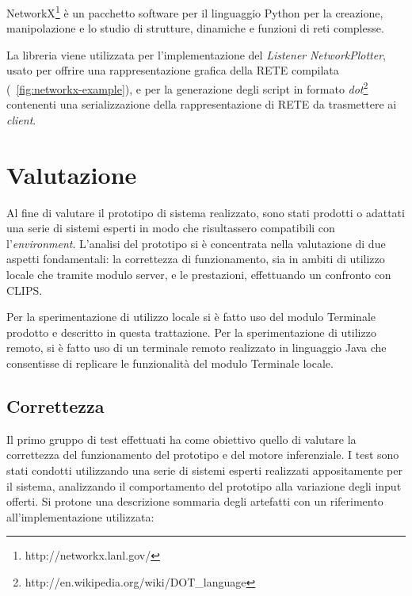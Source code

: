NetworkX\footnote{http://networkx.lanl.gov/} è un pacchetto software per il linguaggio Python per la creazione, manipolazione e lo studio di strutture, dinamiche e funzioni di reti complesse.

La libreria viene utilizzata per l'implementazione del \emph{Listener} \emph{NetworkPlotter}, usato per offrire una rappresentazione grafica della RETE compilata (\figurename~\ref{fig:networkx-example}), e per la generazione degli script in formato \emph{dot}\footnote{http://en.wikipedia.org/wiki/DOT\_language} contenenti una serializzazione della rappresentazione di RETE da trasmettere ai \emph{client}.

\section{Valutazione}

Al fine di valutare il prototipo di sistema realizzato, sono stati prodotti o adattati una serie di sistemi esperti in modo che risultassero compatibili con l'\emph{environment}. L'analisi del prototipo si è concentrata nella valutazione di due aspetti fondamentali: la correttezza di funzionamento, sia in ambiti di utilizzo locale che tramite modulo server, e le prestazioni, effettuando un confronto con CLIPS.

Per la sperimentazione di utilizzo locale si è fatto uso del modulo Terminale prodotto e descritto in questa trattazione. Per la sperimentazione di utilizzo remoto, si è fatto uso di un terminale remoto realizzato in linguaggio Java che consentisse di replicare le funzionalità del modulo Terminale locale.

\subsection{Correttezza}

Il primo gruppo di test effettuati ha come obiettivo quello di valutare la correttezza del funzionamento del prototipo e del motore inferenziale. I test sono stati condotti utilizzando una serie di sistemi esperti realizzati appositamente per il sistema, analizzando il comportamento del prototipo alla variazione degli input offerti. Si protone una descrizione sommaria degli artefatti con un riferimento all'implementazione utilizzata:

